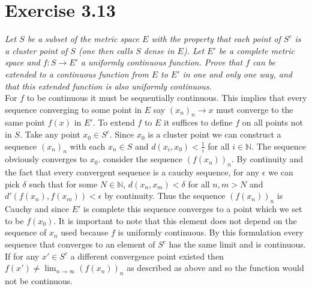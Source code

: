 \documentclass{amsart}
\begin{document}
    \section{Exercise 3.13}
    \emph{Let $S$ be a subset of the metric space $E$ with the property that each point
    of $S^{c}$ is a cluster point of $S$ (one then calls $S$ dense in $E$). Let $E'$ be a complete metric
    space and $f : S \rightarrow E'$ a uniformly continuous function. Prove that $f$ can be extended to a
    continuous function from $E$ to $E'$ in one and only one way, and that this extended function
    is also uniformly continuous.}\\
    For $f$ to be continuous it must be sequentially continuous. This implies that every sequence converging to some point in $E$ say $(x_n)_n \rightarrow x$ must converge to the same point  $f(x)$ in $E'$.
    To extend $f$ to $E$ it suffices to define $f$ on all points not in $S$.
    Take any point $x_0 \in S^{c}$. Since $x_0$ is a cluster point we can construct a sequence $(x_n)_n$ with each $x_n \in S$ and   $d(x_i,x_0) < \frac{1}{i}$ for all $i \in \mathbb{N} $.
    The sequence obviously converges to $x_0$. consider the sequence $(f(x_n))_n $. By continuity and the fact that every convergent sequence is a cauchy sequence,
    for any $\epsilon $ we can pick $\delta $ such that for some $N \in \mathbb{N} $, $d(x_n,x_m) < \delta  $ for all $n,m > N$ and $d'(f(x_n), f(x_m)) < \epsilon $ by continuity. Thus
    the sequence $(f(x_n))_n$ is Cauchy and since $E'$ is complete this sequence converges to a point which we set to be  $f(x_0)$. It is important to note that this element does not depend on the sequence of $x_n$ used because $f$ is uniformly continuous.
    By this formulation every sequence that converges to an element
    of $S^{c}$ has the same limit and is continuous. If for any $x' \in S^{c}$ a different convergence point existed then $f(x') \ne \lim_{n\to\infty}(f(x_n))_n$ as described as above and so the function would not be continuous.
\end{document}
